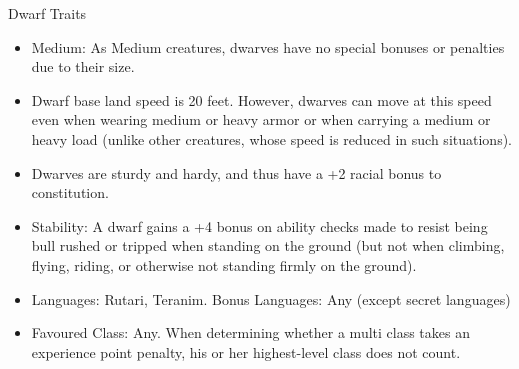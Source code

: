 \begin{35e}{Dwarf Traits}
  \begin{itemize}[noitemsep]
    \item Medium: As Medium creatures, dwarves have no special bonuses or
      penalties due to their size.
    \item Dwarf base land speed is 20 feet. However, dwarves can move at this
      speed even when wearing medium or heavy armor or when carrying a medium or
      heavy load (unlike other creatures, whose speed is reduced in such
      situations).
    \item Dwarves are sturdy and hardy, and thus have a +2 racial bonus to
      constitution.
    \item Stability: A dwarf gains a +4 bonus on ability checks made to resist
      being bull rushed or tripped when standing on the ground (but not when
      climbing, flying, riding, or otherwise not standing firmly on the
      ground).
    \item Languages: Rutari, Teranim. Bonus Languages: Any (except secret
      languages)
    \item Favoured Class: Any. When determining whether a multi class takes an
          experience point penalty, his or her highest-level class does not
          count.
  \end{itemize}
\end{35e}
